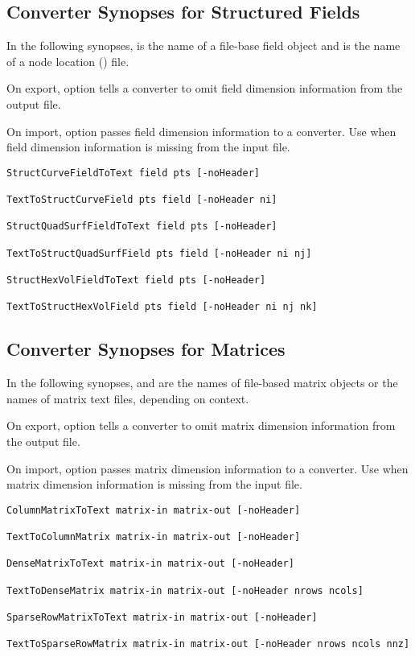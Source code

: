 \subsection{Converter Synopses for Structured Fields}
\label{sec:struct_field_synopses}

In the following synopses,  is the name of a \sr{}
file-base field object and  is the name of a node location
() file.

On export, option  tells a converter to omit
field dimension information from the output file.

On import, option  passes field dimension
information to a converter. Use  when field
dimension information is missing from the input file.

\begin{verbatim}
StructCurveFieldToText field pts [-noHeader]

TextToStructCurveField pts field [-noHeader ni]

StructQuadSurfFieldToText field pts [-noHeader]

TextToStructQuadSurfField pts field [-noHeader ni nj]

StructHexVolFieldToText field pts [-noHeader]

TextToStructHexVolField pts field [-noHeader ni nj nk]

\end{verbatim}

\subsection{Converter Synopses for Matrices}

In the following synopses,  and 
are the names of \sr{} file-based matrix objects or the names
of matrix text files, depending on context.

On export, option  tells a converter to omit matrix
dimension information from the output file.

On import, option  passes matrix dimension
information to a converter.  Use  when matrix
dimension information is missing from the input file.

\begin{verbatim}
ColumnMatrixToText matrix-in matrix-out [-noHeader]

TextToColumnMatrix matrix-in matrix-out [-noHeader]

DenseMatrixToText matrix-in matrix-out [-noHeader]

TextToDenseMatrix matrix-in matrix-out [-noHeader nrows ncols]

SparseRowMatrixToText matrix-in matrix-out [-noHeader]

TextToSparseRowMatrix matrix-in matrix-out [-noHeader nrows ncols nnz]
\end{verbatim}

